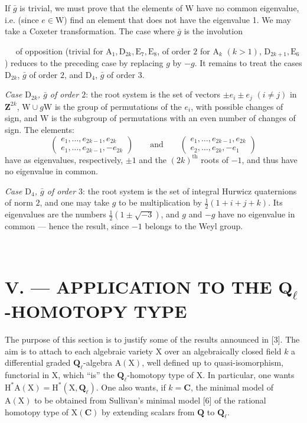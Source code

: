 \documentclass[11pt,leqno]{article}
\newcommand{\Page}[1]{\ifvmode\noindent\else\unskip\ \fi{\footnotesize\textcolor{gray}{[p.\,#1]}}\ \ignorespaces}
\begin{document}
If \(\bar{g}\) is trivial, we must prove that the elements of \(\mathrm{W}\) have no common eigenvalue, i.e. (since \(e\in\mathrm{W}\)) find an element that does not have the eigenvalue 1. We may take a Coxeter transformation. The case where \(\bar{g}\) is the involution

\Page{233}
of opposition (trivial for \(\mathrm{A}_1,\mathrm{D}_{2k},\mathrm{E}_7,\mathrm{E}_8\), of order \(2\) for \(\mathrm{A}_k\) \((k>1)\), \(\mathrm{D}_{2k+1},\mathrm{E}_6\)) reduces to the preceding case by replacing \(g\) by \(-g\). It remains to treat the cases \(\mathrm{D}_{2k}\), \(\bar g\) of order \(2\), and \(\mathrm{D}_4\), \(\bar g\) of order \(3\).

\textit{Case \(\mathrm{D}_{2k}\), \(\bar g\) of order \(2\)}: the root system is the set of vectors \(\pm e_i\pm e_j\) \((i\ne j)\) in \(\mathbf{Z}^{2k}\), \(\mathrm{W}\cup g\mathrm{W}\) is the group of permutations of the \(e_i\), with possible changes of sign, and \(\mathrm{W}\) is the subgroup of permutations with an even number of changes of sign. The elements:
\[
\left(
\begin{array}{l}
e_1,\ldots,e_{2k-1},e_{2k}\\
e_1,\ldots,e_{2k-1},-e_{2k}
\end{array}
\right)
\qquad\text{and}\qquad
\left(
\begin{array}{l}
e_1,\ldots,e_{2k-1},e_{2k}\\
e_2,\ldots,e_{2k},-e_1
\end{array}
\right)
\]
have as eigenvalues, respectively, \(\pm1\) and the \((2k)^{\text{th}}\) roots of \(-1\), and thus have no eigenvalue in common.

\textit{Case \(\mathrm{D}_4\), \(\bar g\) of order \(3\)}: the root system is the set of integral Hurwicz quaternions of norm \(2\), and one may take \(g\) to be multiplication by \(\frac{1}{2}(1+i+j+k)\). Its eigenvalues are the numbers \(\frac{1}{2}(1\pm\sqrt{-3})\), and \(g\) and \(-g\) have no eigenvalue in common — hence the result, since \(-1\) belongs to the Weyl group.

\Page{234}
\section*{\normalfont V. — APPLICATION TO THE \(\mathbf{Q}_{\ell}\)-HOMOTOPY TYPE}

The purpose of this section is to justify some of the results announced in [3]. The aim is to attach to each algebraic variety \(\mathrm{X}\) over an algebraically closed field \(k\) a differential graded \(\mathbf{Q}_{\ell}\)-algebra \(\mathrm{A}(\mathrm{X})\), well defined up to quasi-isomorphism, functorial in \(\mathrm{X}\), which “is” the \(\mathbf{Q}_{\ell}\)-homotopy type of \(\mathrm{X}\). In particular, one wants \(\mathrm{H}^*\mathrm{A}(\mathrm{X})=\mathrm{H}^*(\mathrm{X},\mathbf{Q}_{\ell})\). One also wants, if \(k=\mathbf{C}\), the minimal model of \(\mathrm{A}(\mathrm{X})\) to be obtained from Sullivan's minimal model [6] of the rational homotopy type of \(\mathrm{X}(\mathbf{C})\) by extending scalars from \(\mathbf{Q}\) to \(\mathbf{Q}_{\ell}\).
\end{document}
